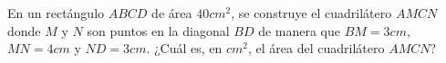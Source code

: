 En un rectángulo $ABCD$ de área $40cm^2$, se construye el cuadrilátero $AMCN$ donde $M$ y $N$ son puntos en la diagonal $BD$ de manera que $BM = 3cm$, $MN = 4cm$ y $ND = 3cm$. ¿Cuál es, en $cm^2$, el área del cuadrilátero $AMCN$?